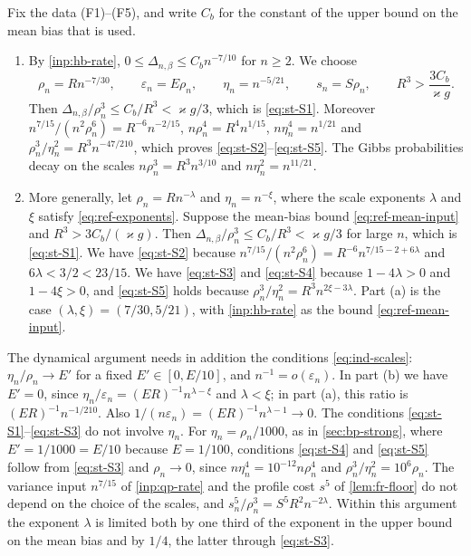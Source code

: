 \begin{remark}\label{rem:st-scales}
Fix the data (F1)--(F5), and write $C_b$ for the constant of the upper bound on the mean bias that is used.
\begin{enumerate}
\item[(a)] By \cref{inp:hb-rate}, $0\le\Delta_{n,\beta}\le C_bn^{-7/10}$ for $n\ge2$. We choose
\begin{equation}\label{b:eq:critical-static-scales}
 \rho_n=Rn^{-7/30},\qquad\varepsilon_n=E\rho_n,\qquad\eta_n=n^{-5/21},\qquad s_n=S\rho_n,\qquad R^3>\frac{3C_b}{\varkappa g}.
\end{equation}
Then $\Delta_{n,\beta}/\rho_n^3\le C_b/R^3<\varkappa g/3$, which is \eqref{eq:st-S1}. Moreover $n^{7/15}/(n^2\rho_n^6)=R^{-6}n^{-2/15}$, $n\rho_n^4=R^4n^{1/15}$, $n\eta_n^4=n^{1/21}$ and $\rho_n^3/\eta_n^2=R^3n^{-47/210}$, which proves \eqref{eq:st-S2}--\eqref{eq:st-S5}. The Gibbs probabilities decay on the scales $n\rho_n^3=R^3n^{3/10}$ and $n\eta_n^2=n^{11/21}$.
\item[(b)] More generally, let $\rho_n=Rn^{-\lambda}$ and $\eta_n=n^{-\xi}$, where the scale exponents $\lambda$ and $\xi$ satisfy \eqref{eq:ref-exponents}. Suppose the mean-bias bound \eqref{eq:ref-mean-input} and $R^3>3C_b/(\varkappa g)$. Then $\Delta_{n,\beta}/\rho_n^3\le C_b/R^3<\varkappa g/3$ for large $n$, which is \eqref{eq:st-S1}. We have \eqref{eq:st-S2} because $n^{7/15}/(n^2\rho_n^6)=R^{-6}n^{7/15-2+6\lambda}$ and $6\lambda<3/2<23/15$. We have \eqref{eq:st-S3} and \eqref{eq:st-S4} because $1-4\lambda>0$ and $1-4\xi>0$, and \eqref{eq:st-S5} holds because $\rho_n^3/\eta_n^2=R^3n^{2\xi-3\lambda}$. Part (a) is the case $(\lambda,\xi)=(7/30,5/21)$, with \cref{inp:hb-rate} as the bound \eqref{eq:ref-mean-input}.
\end{enumerate}
The dynamical argument needs in addition the conditions \eqref{eq:ind-scales}: $\eta_n/\rho_n\to E'$ for a fixed $E'\in[0,E/10]$, and $n^{-1}=o(\varepsilon_n)$. In part (b) we have $E'=0$, since $\eta_n/\varepsilon_n=(ER)^{-1}n^{\lambda-\xi}$ and $\lambda<\xi$; in part (a), this ratio is $(ER)^{-1}n^{-1/210}$. Also $1/(n\varepsilon_n)=(ER)^{-1}n^{\lambda-1}\to0$. The conditions \eqref{eq:st-S1}--\eqref{eq:st-S3} do not involve $\eta_n$. For $\eta_n=\rho_n/1000$, as in \cref{sec:bp-strong}, where $E'=1/1000=E/10$ because $E=1/100$, conditions \eqref{eq:st-S4} and \eqref{eq:st-S5} follow from \eqref{eq:st-S3} and $\rho_n\to0$, since $n\eta_n^4=10^{-12}n\rho_n^4$ and $\rho_n^3/\eta_n^2=10^6\rho_n$. The variance input $n^{7/15}$ of \cref{inp:qp-rate} and the profile cost $s^5$ of \cref{lem:fr-floor} do not depend on the choice of the scales, and $s_n^5/\rho_n^3=S^5R^2n^{-2\lambda}$. Within this argument the exponent $\lambda$ is limited both by one third of the exponent in the upper bound on the mean bias and by $1/4$, the latter through \eqref{eq:st-S3}.
\end{remark}

